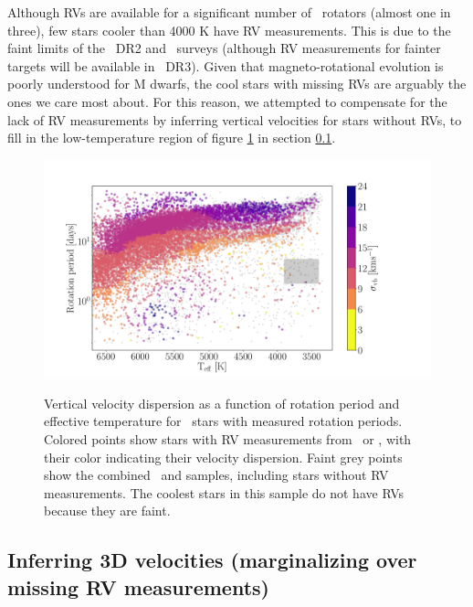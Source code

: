 Although RVs are available for a significant number of \kepler\ rotators
(almost one in three), few stars cooler than 4000 K have RV measurements.
This is due to the faint limits of the \gaia\ DR2 and \lamost\ surveys
(although RV measurements for fainter targets will be available in \gaia\
DR3).
Given that magneto-rotational evolution is poorly understood for M dwarfs, the
cool stars with missing RVs are arguably the ones we care most about.
For this reason, we attempted to compensate for the lack of RV measurements by
inferring vertical velocities for stars without RVs, to fill in the
low-temperature region of figure \ref{fig:existing_rvs} in section
\ref{sec:velocity_inference}.
\begin{figure}[ht!]
\caption{
Vertical velocity dispersion as a function of rotation period and effective
    temperature for \kepler\ stars with measured rotation periods.
Colored points show stars with RV measurements from \gaia\ or \lamost, with
    their color indicating their velocity dispersion.
Faint grey points show the combined \mct\ and \citet{santos2019} samples,
    including stars without RV measurements.
The coolest stars in this sample do not have RVs because they are faint.
}
  \centering \includegraphics[width=1\textwidth]{existing_rvs}
\label{fig:existing_rvs}
\end{figure}


\subsection{Inferring 3D velocities (marginalizing over missing RV
measurements)}
\label{sec:velocity_inference}


